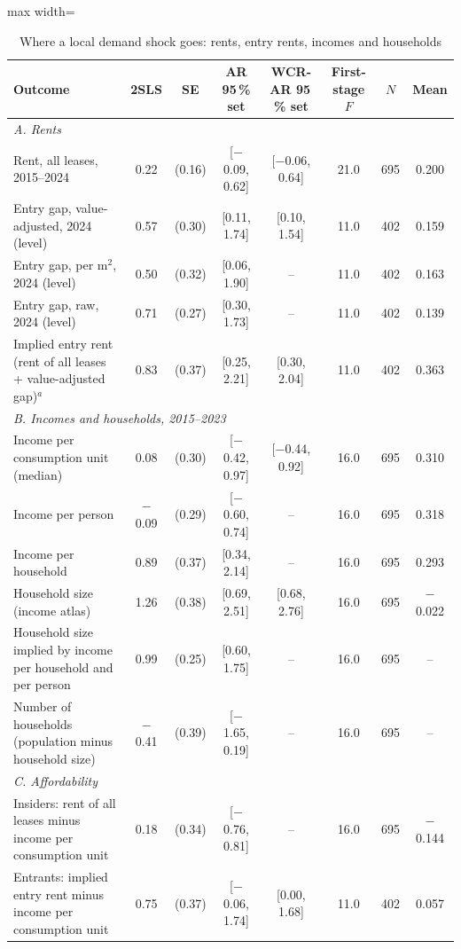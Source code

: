 \begin{table}[!htbp]\centering\small
\caption{Where a local demand shock goes: rents, entry rents, incomes and households}\label{tab:main}
\begin{adjustbox}{max width=\linewidth}\begin{tabular}{lccccccc}\toprule
Outcome & 2SLS & SE & AR 95\,\% set & WCR-AR 95\,\% set & First-stage $F$ & $N$ & Mean\\\midrule
\multicolumn{8}{l}{\textit{A. Rents}}\\
Rent, all leases, 2015--2024 & 0.22 & (0.16) & [$-$0.09, 0.62] & [$-$0.06, 0.64] & 21.0 & 695 & 0.200\\
Entry gap, value-adjusted, 2024 (level) & 0.57 & (0.30) & [0.11, 1.74] & [0.10, 1.54] & 11.0 & 402 & 0.159\\
Entry gap, per m$^2$, 2024 (level) & 0.50 & (0.32) & [0.06, 1.90] & -- & 11.0 & 402 & 0.163\\
Entry gap, raw, 2024 (level) & 0.71 & (0.27) & [0.30, 1.73] & -- & 11.0 & 402 & 0.139\\
Implied entry rent (rent of all leases + value-adjusted gap)$^a$ & 0.83 & (0.37) & [0.25, 2.21] & [0.30, 2.04] & 11.0 & 402 & 0.363\\
\multicolumn{8}{l}{\textit{B. Incomes and households, 2015--2023}}\\
Income per consumption unit (median) & 0.08 & (0.30) & [$-$0.42, 0.97] & [$-$0.44, 0.92] & 16.0 & 695 & 0.310\\
Income per person & $-$0.09 & (0.29) & [$-$0.60, 0.74] & -- & 16.0 & 695 & 0.318\\
Income per household & 0.89 & (0.37) & [0.34, 2.14] & -- & 16.0 & 695 & 0.293\\
Household size (income atlas) & 1.26 & (0.38) & [0.69, 2.51] & [0.68, 2.76] & 16.0 & 695 & $-$0.022\\
Household size implied by income per household and per person & 0.99 & (0.25) & [0.60, 1.75] & -- & 16.0 & 695 & --\\
Number of households (population minus household size) & $-$0.41 & (0.39) & [$-$1.65, 0.19] & -- & 16.0 & 695 & --\\
\multicolumn{8}{l}{\textit{C. Affordability}}\\
Insiders: rent of all leases minus income per consumption unit & 0.18 & (0.34) & [$-$0.76, 0.81] & -- & 16.0 & 695 & $-$0.144\\
Entrants: implied entry rent minus income per consumption unit & 0.75 & (0.37) & [$-$0.06, 1.74] & [0.00, 1.68] & 11.0 & 402 & 0.057\\

\end{tabular}
\end{adjustbox}
\end{table}
